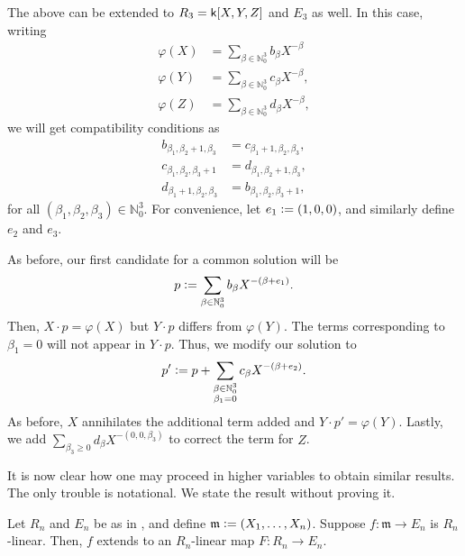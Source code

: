 \begin{obs}
	The above can be extended to $R_{3} = \mathsf{k}[X, Y, Z]$ and $E_{3}$ as well. In this case, writing
	\begin{align*} 
		\varphi(X) &= \sum_{\beta \in \mathbb{N}_{0}^{3}} b_{\beta} X^{-\beta} \\
		\varphi(Y) &= \sum_{\beta \in \mathbb{N}_{0}^{3}} c_{\beta} X^{-\beta},\\
		\varphi(Z) &= \sum_{\beta \in \mathbb{N}_{0}^{3}} d_{\beta} X^{-\beta},
	\end{align*}
	we will get compatibility conditions as
	\begin{align*} 
		b_{\beta_{1}, \beta_{2} + 1, \beta_{3}} &= c_{\beta_{1} + 1, \beta_{2}, \beta_{3}}, \\
		c_{\beta_{1}, \beta_{2}, \beta_{3} + 1} &= d_{\beta_{1}, \beta_{2} + 1, \beta_{3}}, \\
		d_{\beta_{1} + 1, \beta_{2}, \beta_{3}} &= b_{\beta_{1}, \beta_{2}, \beta_{3} + 1},
	\end{align*}
	for all $(\beta_{1}, \beta_{2}, \beta_{3}) \in \mathbb{N}_{0}^{3}$. For convenience, let $e_{1} \vcentcolon= (1, 0, 0)$, and similarly define $e_{2}$ and $e_{3}$. 

	As before, our first candidate for a common solution will be
	\begin{equation*} 
		p \vcentcolon= \sum_{\beta \in \mathbb{N}_{0}^{3}} b_{\beta} X^{-(\beta + e_{1})}.
	\end{equation*}
	Then, $X \cdot p = \varphi(X)$ but $Y \cdot p$ differs from $\varphi(Y)$. The terms corresponding to $\beta_{1} = 0$ will not appear in $Y \cdot p$. Thus, we modify our solution to
	\begin{equation*} 
		p' \vcentcolon= p + \sum_{\substack{\beta \in \mathbb{N}_{0}^{3} \\ \beta_{1} = 0}} c_{\beta} X^{-(\beta + e_{2})}.
	\end{equation*}
	As before, $X$ annihilates the additional term added and $Y \cdot p' = \varphi(Y)$. Lastly, we add $\sum_{\beta_{3} \ge 0} d_{\beta} X^{-(0, 0, \beta_{3})}$ to correct the term for $Z$.
\end{obs}

It is now clear how one may proceed in higher variables to obtain similar results. The only trouble is notational. We state the result without proving it.

\begin{prop}
	Let $R_{n}$ and $E_{n}$ be as in , and define $\mathfrak{m} \vcentcolon= (X_{1}, \ldots, X_{n})$. Suppose $f : \mathfrak{m} \to E_{n}$ is $R_{n}$-linear. Then, $f$ extends to an $R_{n}$-linear map $F : R_{n} \to E_{n}$.
\end{prop}
